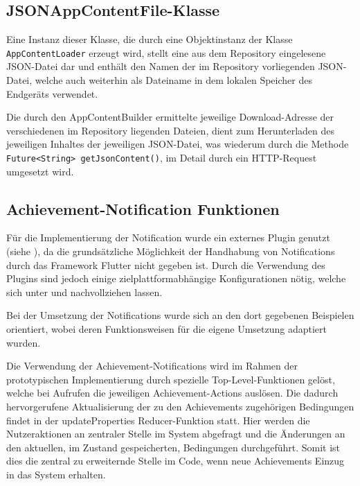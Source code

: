 \documentclass[bibliography=totoc,listof=totoc,BCOR=5mm,DIV=12,oneside]{scrbook}
\begin{document}
{\subsection{JSONAppContentFile-Klasse}
\par Eine Instanz dieser Klasse, die durch eine Objektinstanz der Klasse \texttt{AppContentLoader} erzeugt wird, stellt eine aus dem Repository eingelesene JSON-Datei dar und enthält 
den Namen der im Repository vorliegenden JSON-Datei, welche auch weiterhin als Dateiname in dem lokalen Speicher des Endgeräts verwendet. 
\par Die durch den AppContentBuilder ermittelte jeweilige Download-Adresse der verschiedenen im Repository liegenden Dateien, dient zum Herunterladen des jeweiligen Inhaltes der jeweiligen JSON-Datei, was wiederum durch die Methode \texttt{Future<String> getJsonContent()}, im Detail durch ein HTTP-Request umgesetzt wird.

\subsection{Achievement-Notification Funktionen}
\par Für die Implementierung der Notification wurde ein externes Plugin genutzt (siehe \citep{FlutterLocalNotificationPlugin}), da die grundsätzliche Möglichkeit der Handhabung von Notifications durch das Framework Flutter nicht gegeben ist. Durch die Verwendung des Plugins sind jedoch einige zielplattformabhängige Konfigurationen nötig, welche sich unter \citep[Android Integration]{FlutterLocalNotificationPlugin} und \citep[iOS Integration]{FlutterLocalNotificationPlugin} nachvollziehen lassen.
\par \medskip Bei der Umsetzung der Notifications wurde sich an den dort gegebenen Beispielen orientiert, wobei deren Funktionsweisen für die eigene Umsetzung adaptiert wurden.
\par Die Verwendung der Achievement-Notifications wird im Rahmen der prototypischen Implementierung durch spezielle Top-Level-Funktionen gelöst, welche bei Aufrufen die jeweiligen Achievement-Actions auslösen. Die dadurch hervorgerufene Aktualisierung der zu den Achievements zugehörigen Bedingungen findet in der updateProperties Reducer-Funktion statt. Hier werden die Nutzeraktionen an zentraler Stelle im System abgefragt und die Änderungen an den aktuellen, im Zustand gespeicherten, Bedingungen durchgeführt. Somit ist dies die zentral zu erweiternde Stelle im Code, wenn neue Achievements Einzug in das System erhalten.

}
\end{document}
